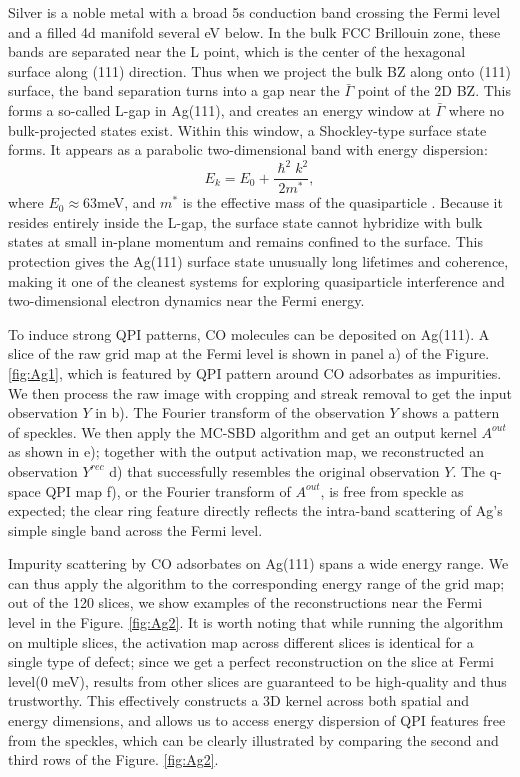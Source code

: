 Silver is a noble metal with a broad 5s conduction band crossing the Fermi level and a filled 4d manifold several eV below. In the bulk FCC Brillouin zone, these bands are separated near the L point, which is the center of the hexagonal surface along (111) direction. Thus when we project the bulk BZ along onto (111) surface, the band separation turns into a gap near the $\bar{\Gamma}$ point of the 2D BZ. This forms a so-called L-gap in Ag(111), and creates an energy window at $\bar{\Gamma}$ where no bulk-projected states exist. Within this window, a Shockley-type surface state forms\cite{bendounanEvolutionRashbaSpinorbitsplit2011}\cite{burgiQuantumCoherenceLifetimes2000}. It appears as a parabolic two-dimensional band with energy dispersion:
\begin{equation}
	E_{k} = E_0 + \frac{\hslash^2k^2}{2m^*}, 
\end{equation}
where $E_0 \approx 63$meV, and $m^*$ is the effective mass of the quasiparticle \cite{paniagoTemperatureDependenceShockleytype1995}. Because it resides entirely inside the L-gap, the surface state cannot hybridize with bulk states at small in-plane momentum and remains confined to the surface. This protection gives the Ag(111) surface state unusually long lifetimes and coherence, making it one of the cleanest systems for exploring quasiparticle interference and two-dimensional electron dynamics near the Fermi energy. 
 
To induce strong \ac{QPI} patterns, CO molecules can be deposited on Ag(111). A slice of the raw grid map at the Fermi level is shown in panel a) of the Figure. \ref{fig:Ag1}, which is featured by QPI pattern around CO adsorbates as impurities. We then process the raw image with cropping and streak removal to get the input observation $Y$ in b). The Fourier transform of the observation $Y$ shows a pattern of speckles. We then apply the \ac{MC-SBD} algorithm and get an output kernel $A^{out}$ as shown in e); together with the output activation map, we reconstructed an observation $Y^{rec}$ d) that successfully resembles the original observation $Y$. The q-space QPI map f), or the Fourier transform of $A^{out}$, is free from speckle as expected; the clear ring feature directly reflects the intra-band scattering of Ag's simple single band across the Fermi level. 

Impurity scattering by CO adsorbates on Ag(111) spans a wide energy range. We can thus apply the algorithm to the corresponding energy range of the grid map; out of the 120 slices, we show examples of the reconstructions near the Fermi level in the Figure. \ref{fig:Ag2}. It is worth noting that while running the algorithm on multiple slices, the activation map across different slices is identical for a single type of defect; since we get a perfect reconstruction on the slice at Fermi level(0 meV), results from other slices are guaranteed to be high-quality and thus trustworthy. This effectively constructs a 3D kernel across both spatial and energy dimensions, and allows us to access energy dispersion of QPI features free from the speckles, which can be clearly illustrated by comparing the second and third rows of the Figure. \ref{fig:Ag2}.
